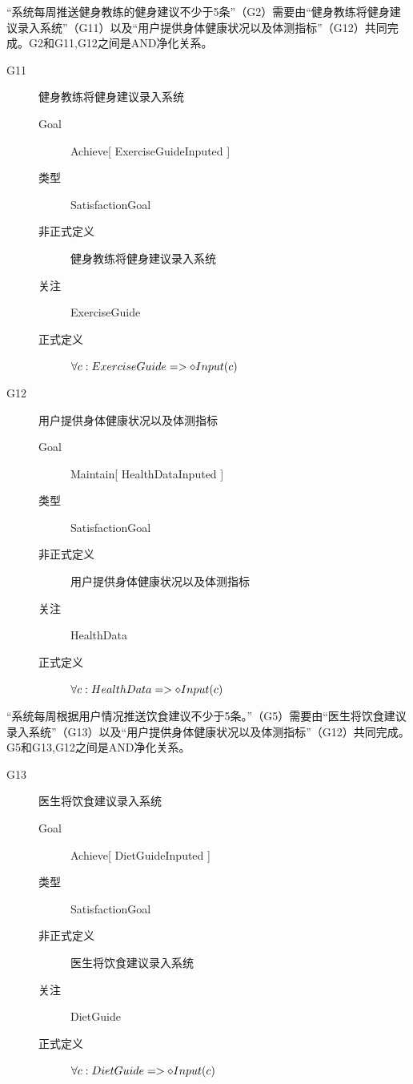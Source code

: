 \documentclass[UTF8]{ctexart}
\begin{document}
“系统每周推送健身教练的健身建议不少于5条”（G2）需要由“健身教练将健身建议录入系统”（G11）以及“用户提供身体健康状况以及体测指标”（G12）共同完成。G2和{G11,G12}之间是AND净化关系。
\begin{description}
\item[G11] 健身教练将健身建议录入系统
\begin{description}
   \item[Goal] Achieve[ ExerciseGuideInputed ]
   \item[类型] SatisfactionGoal
   \item[非正式定义] 健身教练将健身建议录入系统
   \item[关注] ExerciseGuide
   \item[正式定义] $\forall c:ExerciseGuide \\ =>\diamond Input(c)$
\end{description}
\item[G12] 用户提供身体健康状况以及体测指标
\begin{description}
   \item[Goal] Maintain[ HealthDataInputed ]
   \item[类型] SatisfactionGoal
   \item[非正式定义] 用户提供身体健康状况以及体测指标
   \item[关注] HealthData
   \item[正式定义] $\forall c:HealthData \\ =>\diamond Input(c)$
\end{description}
\end{description}

“系统每周根据用户情况推送饮食建议不少于5条。”（G5）需要由“医生将饮食建议录入系统”（G13）以及“用户提供身体健康状况以及体测指标”（G12）共同完成。G5和{G13,G12}之间是AND净化关系。
\begin{description}
\item[G13] 医生将饮食建议录入系统
\begin{description}
   \item[Goal] Achieve[ DietGuideInputed ]
   \item[类型] SatisfactionGoal
   \item[非正式定义] 医生将饮食建议录入系统
   \item[关注] DietGuide
   \item[正式定义] $\forall c:DietGuide \\ =>\diamond Input(c)$
\end{description}
\end{description}
\end{document}
